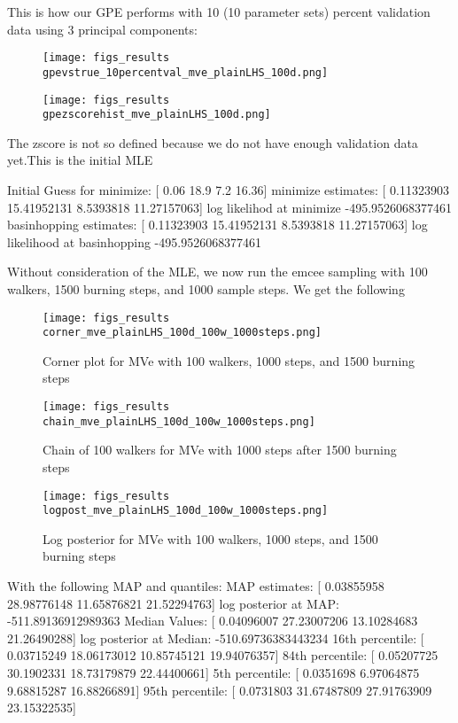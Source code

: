 \documentclass{article}
\begin{document}
This is how our GPE performs with 10 (10 parameter sets) percent validation data using 3 principal components:

\begin{figure}
\centering
\texttt{[image: figs\_results\\gpevstrue\_10percentval\_mve\_plainLHS\_100d.png]}
\label{fig:gpevstrue_10percentval_mve_plainLHS_100d}
\end{figure}

\begin{figure}
\centering
\texttt{[image: figs\_results\\gpezscorehist\_mve\_plainLHS\_100d.png]}
\label{fig:gpezscorehist_mve_plainLHS_100d}
\end{figure}

The zscore is not so defined because we do not have enough validation data yet.This is the initial MLE

Initial Guess for minimize:  [ 0.06 18.9   7.2  16.36]
minimize estimates:  [ 0.11323903 15.41952131  8.5393818  11.27157063]
log likelihod at minimize -495.9526068377461
basinhopping estimates:  [ 0.11323903 15.41952131  8.5393818  11.27157063]
log likelihood at basinhopping -495.9526068377461

Without consideration of the MLE, we now run the emcee sampling with 100 walkers, 1500 burning steps, and 1000 sample steps. We get the following

\begin{figure}
\centering
\texttt{[image: figs\_results\\corner\_mve\_plainLHS\_100d\_100w\_1000steps.png]}
\label{fig:corner_mve_plainLHS_100d_100w_1000steps}
\caption{Corner plot for MVe with 100 walkers, 1000 steps, and 1500 burning steps}
\end{figure}

\begin{figure}
\centering
\texttt{[image: figs\_results\\chain\_mve\_plainLHS\_100d\_100w\_1000steps.png]}
\label{fig:chain_mve_plainLHS_100d_100w_1000steps}
\caption{Chain of 100 walkers for MVe with 1000 steps after 1500 burning steps}
\end{figure}

\begin{figure}
\centering
\texttt{[image: figs\_results\\logpost\_mve\_plainLHS\_100d\_100w\_1000steps.png]}
\label{fig:logpost_mve_plainLHS_100d_100w_1000steps}
\caption{Log posterior for MVe with 100 walkers, 1000 steps, and 1500 burning steps}
\end{figure}

With the following MAP and quantiles:
MAP estimates:  [ 0.03855958 28.98776148 11.65876821 21.52294763]
log posterior at MAP:  -511.89136912989363
Median Values:  [ 0.04096007 27.23007206 13.10284683 21.26490288]
log posterior at Median:  -510.69736383443234
16th percentile:  [ 0.03715249 18.06173012 10.85745121 19.94076357]
84th percentile:  [ 0.05207725 30.1902331  18.73179879 22.44400661]
5th percentile:  [ 0.0351698   6.97064875  9.68815287 16.88266891]
95th percentile:  [ 0.0731803  31.67487809 27.91763909 23.15322535]
\end{document}
